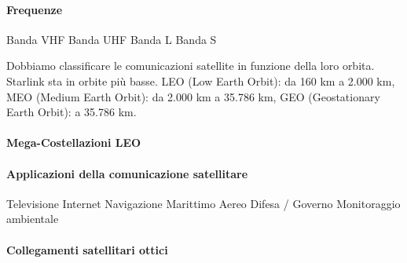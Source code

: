\paragraph{Frequenze}
Banda VHF
Banda UHF
Banda L 
Banda S

Dobbiamo classificare le comunicazioni satellite in funzione della loro orbita. Starlink sta in orbite più basse. LEO (Low Earth Orbit): da 160 km a 2.000 km, MEO (Medium Earth Orbit): da 2.000 km a 35.786 km, GEO (Geostationary Earth Orbit): a 35.786 km. 

\paragraph{Mega-Costellazioni LEO}

\paragraph{Applicazioni della comunicazione satellitare}
Televisione
Internet
Navigazione
Marittimo 
Aereo
Difesa / Governo
Monitoraggio ambientale

\paragraph{Collegamenti satellitari ottici}



